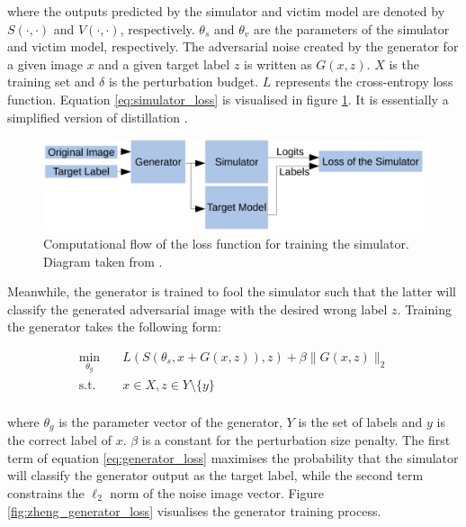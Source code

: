 \noindent where the outputs predicted by the simulator and victim model are denoted by $S(\cdot,\cdot)$ and $V(\cdot,\cdot)$, respectively. $\theta_s$ and $\theta_v$ are the parameters of the simulator and victim model, respectively. The adversarial noise created by the generator for a given image $x$ and a given target label $z$ is written as $G(x,z)$. $X$ is the training set and $\delta$ is the perturbation budget. $L$ represents the cross-entropy loss function. Equation \ref{eq:simulator_loss} is visualised in figure \ref{fig:zheng_simulator_loss}. It is essentially a simplified version of distillation \cite{distillation}.

\begin{figure}[h]
    \centering
    \includegraphics[width=1\textwidth]{graphics/simulator_loss.JPG}
    \caption{Computational flow of the loss function for training the simulator. Diagram taken from \cite{zheng_black_box_GAN}.}
    \label{fig:zheng_simulator_loss}
\end{figure}

Meanwhile, the generator is trained to fool the simulator such that the latter will classify the generated adversarial image with the desired wrong label $z$. Training the generator takes the following form:

\begin{equation}
\begin{aligned}
\min_{\theta_g} \quad & L(S(\theta_s, x + G(x, z)),z) + \beta\|G(x,z)\|_2\\
\textrm{s.t.} \quad & x \in X, z \in Y \setminus \{y\}\\
\label{eq:generator_loss}
\end{aligned}
\end{equation}

\noindent where $\theta_g$ is the parameter vector of the generator, $Y$ is the set of labels and $y$ is the correct label of $x$. $\beta$ is a constant for the perturbation size penalty. The first term of equation \ref{eq:generator_loss} maximises the probability that the simulator will classify the generator output as the target label, while the second term constrains the $\ell_2$ norm of the noise image vector.  Figure \ref{fig:zheng_generator_loss} visualises the generator training process.

